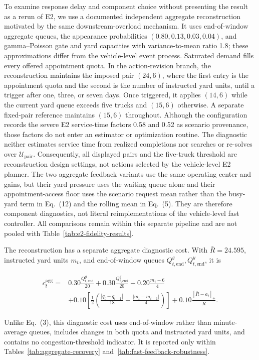 \documentclass[preprint,12pt,authoryear,a4paper]{elsarticle}
\begin{document}
To examine response delay and component choice without presenting the result as a rerun of E2, we use a documented independent aggregate reconstruction motivated by the same downstream-overload mechanism. It uses end-of-window aggregate queues, the appearance probabilities \((0.80,0.13,0.03,0.04)\), and gamma--Poisson gate and yard capacities with variance-to-mean ratio 1.8; these approximations differ from the vehicle-level event process. Saturated demand fills every offered appointment quota. In the action-revision branch, the reconstruction maintains the imposed pair \((24,6)\), where the first entry is the appointment quota and the second is the number of instructed yard units, until a trigger after one, three, or seven days. Once triggered, it applies \((14,6)\) while the current yard queue exceeds five trucks and \((15,6)\) otherwise. A separate fixed-pair reference maintains \((15,6)\) throughout. Although the configuration records the severe E2 service-time factors 0.58 and 0.52 as scenario provenance, those factors do not enter an estimator or optimization routine. The diagnostic neither estimates service time from realized completions nor searches or re-solves over \(\mathcal U_{\mathrm{pair}}\). Consequently, all displayed pairs and the five-truck threshold are reconstruction design settings, not actions selected by the vehicle-level E2 planner. The two aggregate feedback variants use the same operating center and gains, but their yard pressure uses the waiting queue alone and their appointment-access floor uses the scenario request mean rather than the busy-yard term in Eq.~(12) and the rolling mean in Eq.~(5). They are therefore component diagnostics, not literal reimplementations of the vehicle-level fast controller. All comparisons remain within this separate pipeline and are not pooled with Table~\ref{tab:e2-fidelity-results}.

The reconstruction has a separate aggregate diagnostic cost. With \(\bar R=24.595\), instructed yard units \(m_t\), and end-of-window queues \(Q_{t,\mathrm{end}}^g,Q_{t,\mathrm{end}}^y\), it is

\[
\begin{aligned}
c_t^{\mathrm{agg}}={}&
0.30\frac{Q_{t,\mathrm{end}}^g}{20}
+0.30\frac{Q_{t,\mathrm{end}}^y}{20}
+0.20\frac{m_t-6}{4}\\
&+0.10\left[
\frac{1}{2}\left(
\frac{|q_t-q_{t-1}|}{18}
+\frac{|m_t-m_{t-1}|}{4}
\right)\right]
+0.10\frac{[\bar R-a_t]_+}{\bar R}.
\end{aligned}
\]

Unlike Eq.~(3), this diagnostic cost uses end-of-window rather than minute-average queues, includes changes in both quota and instructed yard units, and contains no congestion-threshold indicator. It is reported only within Tables~\ref{tab:aggregate-recovery} and~\ref{tab:fast-feedback-robustness}.
\end{document}
